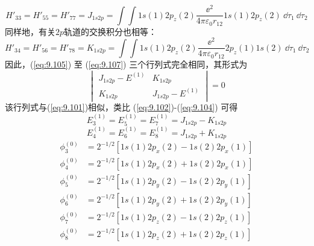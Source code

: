     \begin{equation*}
        H'_{33} = H'_{55} = H'_{77} = J_{1s2p} = \int\int 1s(1)2p_z(2)\frac{\ee ^2}{4\pi\varepsilon_0 r_{12}}1s(1)2p_z(2) \:\dd \tau_1\: \dd \tau_2
    \end{equation*}
    同样地，有关$2p$轨道的交换积分也相等：
    \begin{equation*}
        H'_{34} = H'_{56} = H'_{78} = K_{1s2p} = \int\int 1s(1)2p_z(2)\frac{\ee ^2}{4\pi\varepsilon_0 r_{12}}2p_z(1)1s(2)\:\dd \tau_1\: \dd \tau_2
    \end{equation*}
    因此，(\ref{eq:9.105}) 至 (\ref{eq:9.107}) 三个行列式完全相同，其形式为
    \begin{equation*}
        \begin{vmatrix}
            J_{1s2p} - E^{\left(1\right)} & K_{1s2p} \\
            K_{1s2p} & J_{1s2p} - E^{\left(1\right)}
        \end{vmatrix} = 0
    \end{equation*}
    该行列式与(\ref{eq:9.101})相似，类比 (\ref{eq:9.102})-(\ref{eq:9.104}) 可得
    \begin{equation}
        E_{3}^{\left(1\right)} = E_{5}^{\left(1\right)} = E_7^{\left(1\right)} = J_{1s2p} - K_{1s2p}
        \label{eq:9.108}
    \end{equation}
    \begin{equation}
        E_{4}^{\left(1\right)} = E_{6}^{\left(1\right)} = E_8^{\left(1\right)} = J_{1s2p} + K_{1s2p}
        \label{eq:9.109}
    \end{equation}
    \begin{equation}
        \begin{aligned}
            \phi_3^{\left(0\right)} &= 2^{-1/2}\left[1s\left(1\right)2p_x\left(2\right) - 1s\left(2\right)2p_x\left(1\right)\right] \\
            \phi_4^{\left(0\right)} &= 2^{-1/2}\left[1s\left(1\right)2p_x\left(2\right) + 1s\left(2\right)2p_x\left(1\right)\right] \\
            \phi_5^{\left(0\right)} &= 2^{-1/2}\left[1s\left(1\right)2p_y\left(2\right) - 1s\left(2\right)2p_y\left(1\right)\right] \\
            \phi_6^{\left(0\right)} &= 2^{-1/2}\left[1s\left(1\right)2p_y\left(2\right) + 1s\left(2\right)2p_y\left(1\right)\right] \\
            \phi_7^{\left(0\right)} &= 2^{-1/2}\left[1s\left(1\right)2p_z\left(2\right) - 1s\left(2\right)2p_z\left(1\right)\right] \\
            \phi_8^{\left(0\right)} &= 2^{-1/2}\left[1s\left(1\right)2p_z\left(2\right) + 1s\left(2\right)2p_z\left(1\right)\right]
        \end{aligned}
        \label{eq:9.110}
    \end{equation}

